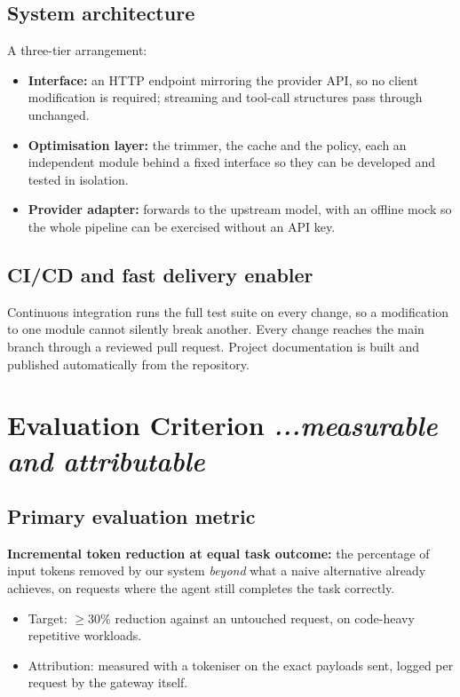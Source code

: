 \documentclass[11pt,a4paper]{article}
\newcommand{\BvrHint}[1]{%
  {\normalfont\normalsize\itshape\hfill #1}}
\begin{document}
\subsection{System architecture}
A three-tier arrangement:
\begin{itemize}[noitemsep]
  \item \textbf{Interface:} an HTTP endpoint mirroring the provider API, so no
        client modification is required; streaming and tool-call structures pass
        through unchanged.
  \item \textbf{Optimisation layer:} the trimmer, the cache and the policy, each
        an independent module behind a fixed interface so they can be developed
        and tested in isolation.
  \item \textbf{Provider adapter:} forwards to the upstream model, with an
        offline mock so the whole pipeline can be exercised without an API key.
\end{itemize}

\subsection{CI/CD and fast delivery enabler}
Continuous integration runs the full test suite on every change, so a
modification to one module cannot silently break another. Every change reaches
the main branch through a reviewed pull request. Project documentation is built
and published automatically from the repository.

\section{Evaluation Criterion \BvrHint{...measurable and attributable}}

\subsection{Primary evaluation metric}
\textbf{Incremental token reduction at equal task outcome:} the percentage of
input tokens removed by our system \emph{beyond} what a naive alternative
already achieves, on requests where the agent still completes the task
correctly.

\begin{itemize}[noitemsep]
  \item Target: $\geq 30\%$ reduction against an untouched request, on
        code-heavy repetitive workloads.
  \item Attribution: measured with a tokeniser on the exact payloads sent, logged
        per request by the gateway itself.
\end{itemize}
\end{document}
